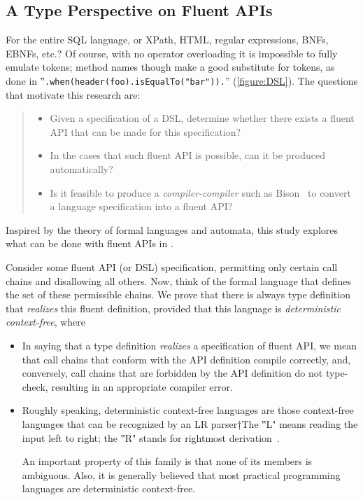 \subsection{A Type Perspective on Fluent APIs}
For the entire SQL language,
or XPath, HTML, regular expressions, BNFs, EBNFs, etc.?
Of course, with no operator overloading it is impossible
to fully emulate tokens; method names though make a good substitute for tokens, as done
in ‟\lstinline{.when(header(foo).isEqualTo("bar")).}” (\cref{figure:DSL}).
The questions that motivate this research are:
\begin{quote}
  \begin{itemize}
    \item Given a specification of a DSL, determine whether there exists
        a fluent API that can be made for this specification?
    \item In the cases that such fluent API is possible,
      can it be produced automatically?
    \item Is it feasible to produce a \emph{compiler-compiler} such as Bison~\cite{Bison:manual}
        to convert a language specification into a fluent API?
\end{itemize}
\end{quote}

Inspired by the theory of formal languages and automata,
  this study explores what can be done with fluent APIs in \Java.

Consider some fluent API (or DSL) specification, permitting only certain call
chains and disallowing all others.
Now, think of the formal language that defines the set of these permissible
chains.
We prove that there is always \Java type definition that
  \emph{realizes} this fluent definition, provided that this
  language is \emph{deterministic context-free}, where
\begin{itemize}
  \item In saying that a type definition \emph{realizes} a specification of
    fluent API, we mean that call chains that conform with the API definition
    compile correctly, and, conversely, call chains that are forbidden by the
    API definition do not type-check, resulting in an appropriate compiler
    error. \item Roughly speaking, deterministic context-free languages are
    those context-free languages that can be recognized by an LR parser†{The
      ‟L" means reading the input left to right; the ‟R" stands for rightmost
    derivation}~\cite{Aho:Sethi:Ullman:86}.
    \par
    An important property of this family is that none of its members is
    ambiguous. Also, it is generally believed that most practical programming
    languages are deterministic context-free.
\end{itemize}

